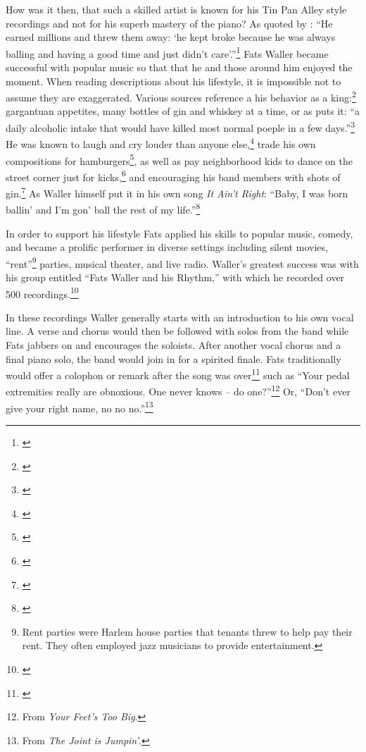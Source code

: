 \documentclass[11pt]{report}
\begin{document}
	\label{sec:thesis}
	How was it then, that such a skilled artist is known for his Tin Pan Alley style recordings and not for his superb mastery of the piano? As quoted by \citeauthor{jazz_scene}: ``He earned millions and threw them away: `he kept broke because he was always balling and having a good time and just didn't care'.''\footnote{\cite[208]{jazz_scene}} Fats Waller became successful with popular music so that that he and those around him enjoyed the moment. When reading descriptions about his lifestyle, it is impossible not to assume they are exaggerated. Various sources reference a his behavior as a king:\footnote{\cite[207]{jazz_scene}} gargantuan appetites, many bottles of gin and whiskey at a time, or as \citeauthor{life} puts it: ``a daily alcoholic intake that would have killed most normal poeple in a few days.''\footnote{\cite[2]{life}} He was known to laugh and cry louder than anyone else,\footnote{\cite[208]{jazz_scene}} trade his own compositions for hamburgers\footnote{\cite[144]{visions}}, as well as pay neighborhood kids to dance on the street corner just for kicks,\footnote{\cite[2]{life}} and encouraging his band members with shots of gin.\footnote{\cite[227]{anecdotes}} As Waller himself put it in his own song \emph{It Ain't Right}: ``Baby, I was born ballin' and I'm gon' ball the rest of my life.''\footnote{\cite[5]{outside-insider}}
	
	In order to support his lifestyle Fats applied his skills to popular music, comedy, and became a prolific performer in diverse settings including silent movies, ``rent''\footnote{Rent parties were Harlem house parties that tenants threw to help pay their rent. They often employed jazz musicians to provide entertainment.} parties, musical theater, and live radio. Waller's greatest success was with his group entitled ``Fats Waller and his Rhythm,'' with which he recorded over 500 recordings.\footnote{\cite[145]{visions}}
	
	In these recordings Waller generally starts with an introduction to his own vocal line. A verse and chorus would then be followed with solos from the band while Fats jabbers on and encourages the soloists. After another vocal chorus and a final piano solo, the band would join in for a spirited finale. Fats traditionally would offer a colophon or remark after the song was over\footnote{\cite[6]{outside-insider}} such as ``Your pedal extremities really are obnoxious. One never knows -- do one?''\footnote{From \emph{Your Feet's Too Big}.} Or, ``Don't ever give your right name, no no no.''\footnote{From \emph{The Joint is Jumpin'}.}
\end{document}
